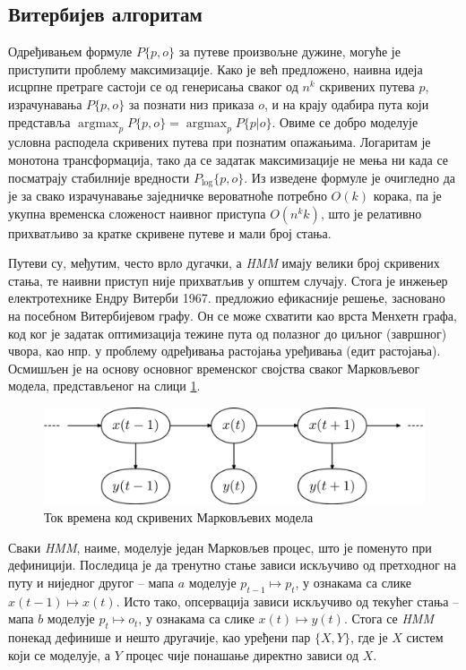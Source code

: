 \documentclass[12pt,oneside]{memoir}
\begin{document}
\begin{CJK}{UTF8}{ipxm}
\section{Витербијев алгоритам}
Одређивањем формуле $P\{p, o\}$ за путеве произвољне дужине, могуће је приступити проблему максимизације. Како је већ предложено, наивна идеја исцрпне претраге састоји се од генерисања сваког од $n^k$ скривених путева $p$, израчунавања $P\{p, o\}$ за познати низ приказа $o$, и на крају одабира пута који представља $\operatorname*{argmax}_p P\{p, o\} = \operatorname*{argmax}_p P\{p | o\}$. Овиме се добро моделује условна расподела скривених путева при познатим опажањима. Логаритам је монотона трансформација, тако да се задатак максимизације не мења ни када се посматрају стабилније вредности $P_{\log}\{p, o\}$. Из изведене формуле је очигледно да је за свако израчунавање заједничке вероватноће потребно $O(k)$ корака, па је укупна временска сложеност наивног приступа $O(n^k k)$, што је релативно прихватљиво за кратке скривене путеве и мали број стања.

Путеви су, међутим, често врло дугачки, а \textit{HMM} имају велики број скривених стања, те наивни приступ није прихватљив у општем случају. Стога је инжењер електротехнике Ендру Витерби 1967. предложио ефикасније решење\cite{viterbi1967}, засновано на посебном Витербијевом графу. Он се може схватити као врста Менхетн графа, код ког је задатак оптимизација тежине пута од полазног до циљног (завршног) чвора, као нпр. у проблему одређивања растојања уређивања (едит растојања). Осмишљен је на основу основног временског својства сваког Марковљевог модела, представљеног на слици \ref{fig:vreme}.

\begin{figure}[H]
  \centering
  \includegraphics[width=.85\textwidth]{vreme.png}
  \caption{Ток времена код скривених Марковљевих модела\cite{vreme}}
  \label{fig:vreme}
\end{figure}

Сваки \textit{HMM}, наиме, моделује један Марковљев процес, што је поменуто при дефиницији. Последица је да тренутно стање зависи искључиво од претходног на путу и ниједног другог -- мапа $a$ моделује $p_{t-1} \mapsto p_t$, у ознакама са слике $x(t-1) \mapsto x(t)$. Исто тако, опсервација зависи искључиво од текућег стања -- мапа  $b$ моделује $p_t \mapsto o_t$, у ознакама са слике $x(t) \mapsto y(t)$. Стога се \textit{HMM} понекад дефинише и нешто другачије, као уређени пар $\{X, Y\}$, где је $X$ систем који се моделује, а $Y$ процес чије понашање директно зависи од $X$.


\end{CJK}
\end{document}

